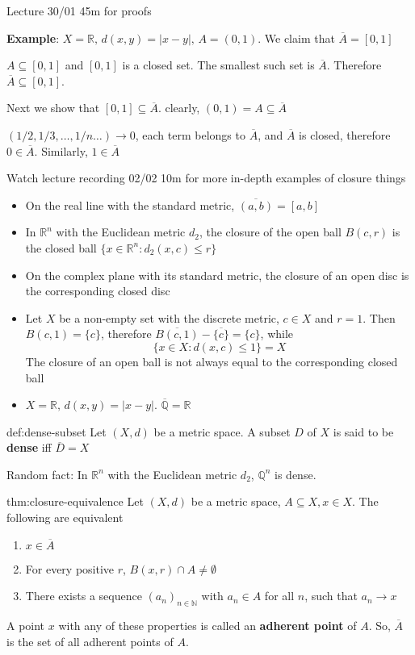 \documentclass[landscape, 8pt]{extarticle}
\begin{document}
\begin{multicols}{3}
Lecture 30/01 45m for proofs

\textbf{Example}: $X = \mathbb{R},\,d(x,y) = \lvert x - y \rvert,\,A = (0,1)$. We claim that $\overline{A} = [0,1]$

$A \subseteq [0,1]$ and $[0,1]$ is a closed set. The smallest such set is $\overline{A}$. Therefore $\overline{A} \subseteq [0,1]$. 

Next we show that $[0,1] \subseteq \overline{A}$. clearly, $(0,1) = A \subseteq \overline{A}$

$(1 / 2, 1 /3 ,\dots, 1 /n \dots)\to 0$, each term belongs to $\overline{A}$, and $\overline{A}$ is closed, therefore $0\in \overline{A}$. Similarly, $1\in \overline{A}$

Watch lecture recording 02/02 10m for more in-depth examples of closure things
\begin{itemize}
    \item On the real line with the standard metric, $\overline{(a,b)} = [a,b]$
    \item In $\mathbb{R}^{n}$ with the Euclidean metric $d_{2}$, the closure of the open ball $B(c,r)$ is the closed ball $\{x\in\mathbb{R}^{n}: d_{2}(x,c)\le r\}$
    \item On the complex plane with its standard metric, the closure of an open disc is the corresponding closed disc
    \item Let $X$ be a non-empty set with the discrete metric, $c\in X$ and $r =1$. Then $B(c,1) = \{c\}$, therefore $\overline{B(c,1)} - \overline{\{c\}} = \{c\}$, while
        \[\{x\in X : d(x,c) \le 1\} = X\]
        The closure of an open ball is not always equal to the corresponding closed ball
    \item $X = \mathbb{R},\,d(x,y) = \lvert x - y \rvert$. $\overline{\mathbb{Q}} = \mathbb{R}$
\end{itemize}

\begin{dfn}{def:dense-subset}{}
    Let $(X, d)$ be a metric space. A subset $D$ of $X$ is said to be \textbf{dense} iff $\overline{D} = X$
\end{dfn}

Random fact: In $\mathbb{R}^{n}$ with the Euclidean metric $d_{2}$, $\mathbb{Q}^{n}$ is dense.

\begin{thm}{thm:closure-equivalence}{}
    Let $(X, d)$ be a metric space, $A \subseteq X, x\in X$. The following are equivalent
    \begin{enumerate}
        \item $x\in\overline{A}$
        \item For every positive $r$, $B(x,r) \cap A \ne \emptyset$
        \item There exists a sequence $(a_{n})_{n\in \mathbb{N}}$ with $a_{n}\in A$ for all $n$, such that $a_{n}\to x$
    \end{enumerate}
    A point $x$ with any of these properties is called an \textbf{adherent point} of $A$. So, $\overline{A}$ is the set of all adherent points of $A$.
\end{thm}


\end{multicols}
\end{document}

